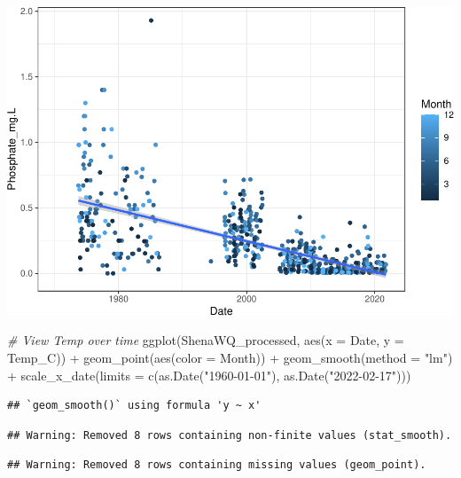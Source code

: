 \documentclass[
  12pt,
]{article}
\newenvironment{Shaded}{\begin{snugshade}}{\end{snugshade}}
\newcommand{\AttributeTok}[1]{\textcolor[rgb]{0.77,0.63,0.00}{#1}}
\newcommand{\CommentTok}[1]{\textcolor[rgb]{0.56,0.35,0.01}{\textit{#1}}}
\newcommand{\FunctionTok}[1]{\textcolor[rgb]{0.00,0.00,0.00}{#1}}
\newcommand{\NormalTok}[1]{#1}
\newcommand{\SpecialCharTok}[1]{\textcolor[rgb]{0.00,0.00,0.00}{#1}}
\newcommand{\StringTok}[1]{\textcolor[rgb]{0.31,0.60,0.02}{#1}}
\begin{document}
\includegraphics{Project_Template_files/figure-latex/unnamed-chunk-1-3.pdf}

\begin{Shaded}
\begin{Highlighting}[]
\CommentTok{\# View Temp over time}
\FunctionTok{ggplot}\NormalTok{(ShenaWQ\_processed, }\FunctionTok{aes}\NormalTok{(}\AttributeTok{x =}\NormalTok{ Date, }\AttributeTok{y =}\NormalTok{ Temp\_C)) }\SpecialCharTok{+}
  \FunctionTok{geom\_point}\NormalTok{(}\FunctionTok{aes}\NormalTok{(}\AttributeTok{color =}\NormalTok{ Month)) }\SpecialCharTok{+}
  \FunctionTok{geom\_smooth}\NormalTok{(}\AttributeTok{method =} \StringTok{"lm"}\NormalTok{) }\SpecialCharTok{+}
  \FunctionTok{scale\_x\_date}\NormalTok{(}\AttributeTok{limits =} \FunctionTok{c}\NormalTok{(}\FunctionTok{as.Date}\NormalTok{(}\StringTok{"1960{-}01{-}01"}\NormalTok{), }
                          \FunctionTok{as.Date}\NormalTok{(}\StringTok{"2022{-}02{-}17"}\NormalTok{)))}
\end{Highlighting}
\end{Shaded}

\begin{verbatim}
## `geom_smooth()` using formula 'y ~ x'
\end{verbatim}

\begin{verbatim}
## Warning: Removed 8 rows containing non-finite values (stat_smooth).
\end{verbatim}

\begin{verbatim}
## Warning: Removed 8 rows containing missing values (geom_point).
\end{verbatim}
\end{document}
